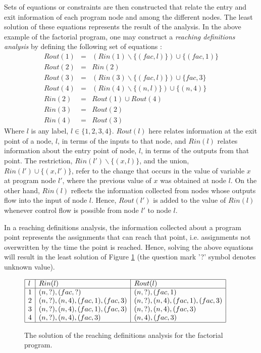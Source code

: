\documentclass[10pt,a4paper,final,oneside,fleqn]{book}
\begin{document}
Sets of equations or constraints are then constructed that relate the entry and exit information of each program node and among the different nodes.  The least solution of these equations represents the result of the analysis.  In the above example of the factorial program, one may construct a {\itshape reaching definitions analysis\/} by defining the following set of equations \cite{nielson1}:
\begin{eqnarray*}
Rout(1)&=&(Rin(1)\backslash\{(fac,l)\})\cup\{(fac,1)\}\\
Rout(2)&=&Rin(2)\\
Rout(3)&=&(Rin(3)\backslash\{(fac,l)\})\cup\{fac,3\}\\
Rout(4)&=&(Rin(4)\backslash\{(n,l)\})\cup\{(n,4)\}\\
Rin(2)&=&Rout(1)\cup Rout(4)\\
Rin(3)&=&Rout(2)\\
Rin(4)&=&Rout(3)
\end{eqnarray*}
\noindent
Where $l$ is any label, $l\in\{1,2,3,4\}$. $Rout(l)$ here relates information at the exit point of a node, $l$, in terms of the inputs to that node, and $Rin(l)$ relates information about the entry point of node, $l$, in terms of the outputs from that point. The restriction, $Rin(l')\backslash\{(x,l)\}$, and the union, $Rin(l')\cup\{(x,l')\}$, refer to the change that occurs in the value of variable $x$ at program node $l'$, where the previous value of $x$ was obtained at node $l$. On the other hand, $Rin(l)$ reflects the information collected from nodes whose outputs flow into the input of node $l$.  Hence, $Rout(l')$ is added to the value of $Rin(l)$ whenever control flow is possible from node $l'$ to node $l$.

In a reaching definitions analysis, the information collected about a program point represents the assignments that can reach that point, i.e. assignments not overwritten by the time the point is reached.  Hence, solving the above equations will result in the least solution of Figure \ref{soldfa} (the question mark '?' symbol denotes unknown value).
\begin{figure}[bht]
\begin{center}
$\begin{array}{|l|l|l|}\hline
l&Rin(l)&Rout(l)\\\hline
1&(n,?),(fac,?)&(n,?),(fac,1)\\
2&(n,?),(n,4),(fac,1),(fac,3)&(n,?),(n,4),(fac,1),(fac,3)\\
3&(n,?),(n,4),(fac,1),(fac,3)&(n,?),(n,4),(fac,3)\\
4&(n,?),(n,4),(fac,3)&(n,4),(fac,3)\\
\hline
\end{array}$
\end{center}
\caption{The solution of the reaching definitions analysis for the factorial program.\label{soldfa}}
\end{figure}
\end{document}
